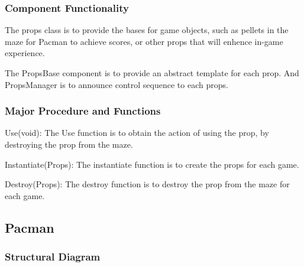 \documentclass[11pt]{article}
\begin{document}
\subsubsection{Component Functionality}
The props class is to provide the bases for game objects, such as pellets in the maze for Pacman to achieve scores, or other props that will enhence in-game experience.

The PropsBase component is to provide an abstract template for each prop. And PropsManager is to announce control sequence to each props.
\subsubsection{Major Procedure and Functions}
Use(void): The Use function is to obtain the action of using the prop, by destroying the prop from the maze.

Instantiate(Props): The instantiate function is to create the props for each game.

Destroy(Props): The destroy function is to destroy the prop from the maze for each game.

\subsection{Pacman}
\subsubsection{Structural Diagram}
\end{document}
